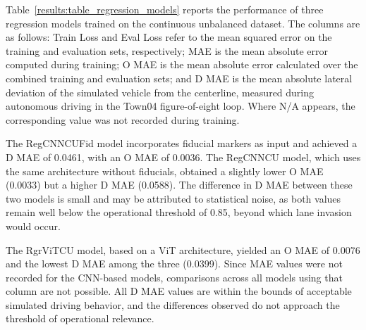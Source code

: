 Table~\ref{results:table_regression_models} reports the performance of three regression models trained on the continuous unbalanced dataset. The columns are as follows: Train Loss and Eval Loss refer to the mean squared error on the training and evaluation sets, respectively; MAE is the mean absolute error computed during training; O MAE is the mean absolute error calculated over the combined training and evaluation sets; and D MAE is the mean absolute lateral deviation of the simulated vehicle from the centerline, measured during autonomous driving in the Town04 figure-of-eight loop. Where N/A appears, the corresponding value was not recorded during training.

The RegCNNCUFid model incorporates fiducial markers as input and achieved a D MAE of 0.0461, with an O MAE of 0.0036. The RegCNNCU model, which uses the same architecture without fiducials, obtained a slightly lower O MAE (0.0033) but a higher D MAE (0.0588). The difference in D MAE between these two models is small and may be attributed to statistical noise, as both values remain well below the operational threshold of 0.85, beyond which lane invasion would occur.

The RgrViTCU model, based on a ViT architecture, yielded an O MAE of 0.0076 and the lowest D MAE among the three (0.0399). Since MAE values were not recorded for the CNN-based models, comparisons across all models using that column are not possible. All D MAE values are within the bounds of acceptable simulated driving behavior, and the differences observed do not approach the threshold of operational relevance.




